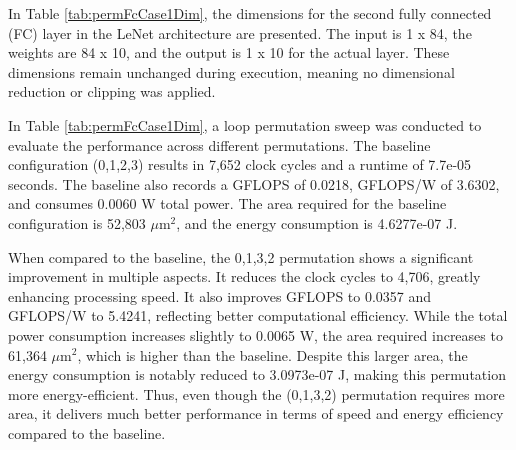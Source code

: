 In Table \ref{tab:permFcCase1Dim}, the dimensions for the second fully connected (FC) layer in the LeNet architecture are presented. The input is 1 x 84, the weights are 84 x 10, and the output is 1 x 10 for the actual layer. These dimensions remain unchanged during execution, meaning no dimensional reduction or clipping was applied.
\\
\begin{table}[H]
\centering
\caption{Loop permutation sweep}
\label{tab:permFcCase1Sweep}
\end{table}

In Table \ref{tab:permFcCase1Dim}, a loop permutation sweep was conducted to evaluate the performance across different permutations. The baseline configuration (0,1,2,3) results in 7,652 clock cycles and a runtime of 7.7e-05 seconds. The baseline also records a GFLOPS of 0.0218, GFLOPS/W of 3.6302, and consumes 0.0060 W total power. The area required for the baseline configuration is 52,803 $\mu\text{m}^2$, and the energy consumption is 4.6277e-07 J.

When compared to the baseline, the 0,1,3,2 permutation shows a significant improvement in multiple aspects. It reduces the clock cycles to 4,706, greatly enhancing processing speed. It also improves GFLOPS to 0.0357 and GFLOPS/W to 5.4241, reflecting better computational efficiency. While the total power consumption increases slightly to 0.0065 W, the area required increases to 61,364 $\mu\text{m}^2$, which is higher than the baseline. Despite this larger area, the energy consumption is notably reduced to 3.0973e-07 J, making this permutation more energy-efficient. Thus, even though the (0,1,3,2) permutation requires more area, it delivers much better performance in terms of speed and energy efficiency compared to the baseline.

